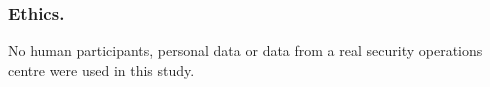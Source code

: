 \begin{credits}
\subsubsection{Ethics.}
No human participants, personal data or data from a real security operations centre
were used in this study.
\end{credits}
